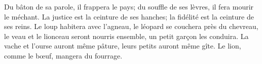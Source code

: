 Du bâton de sa parole, il frappera le pays;
	du souffle de ses lèvres, il fera mourir le méchant.
La justice est la ceinture de ses hanches;
	la fidélité est la ceinture de ses reins.
Le loup habitera avec l’agneau, le léopard se couchera près du chevreau,
	le veau et le lionceau seront nourris ensemble,
	un petit garçon les conduira.
La vache et l’ourse auront même pâture, leurs petits auront même gîte.
	Le lion, comme le bœuf, mangera du fourrage.
